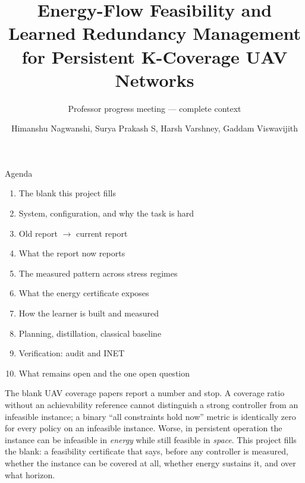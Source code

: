 \documentclass[aspectratio=169,10pt]{beamer}
\title{Energy-Flow Feasibility and Learned Redundancy Management for Persistent K-Coverage UAV Networks}
\subtitle{Professor progress meeting --- complete context}
\author{Himanshu Nagwanshi, Surya Prakash S, Harsh Varshney, Gaddam Viswavijith}
\date{}
\begin{document}
\begin{frame}
  \titlepage
\end{frame}

\begin{frame}{Agenda}
  \begin{enumerate}\small
    \item The blank this project fills
    \item System, configuration, and why the task is hard
    \item Old report $\rightarrow$ current report
    \item What the report now reports
    \item The measured pattern across stress regimes
    \item What the energy certificate exposes
    \item How the learner is built and measured
    \item Planning, distillation, classical baseline
    \item Verification: audit and INET
    \item What remains open and the one open question
  \end{enumerate}
\end{frame}

\begin{frame}{The blank}
  \small
  UAV coverage papers report a number and stop. A coverage ratio without an achievability reference cannot distinguish a strong controller from an infeasible instance; a binary ``all constraints hold now'' metric is identically zero for every policy on an infeasible instance. Worse, in persistent operation the instance can be infeasible in \emph{energy} while still feasible in \emph{space}. This project fills the blank: a feasibility certificate that says, before any controller is measured, whether the instance can be covered at all, whether energy sustains it, and over what horizon.
\end{frame}
\end{document}
